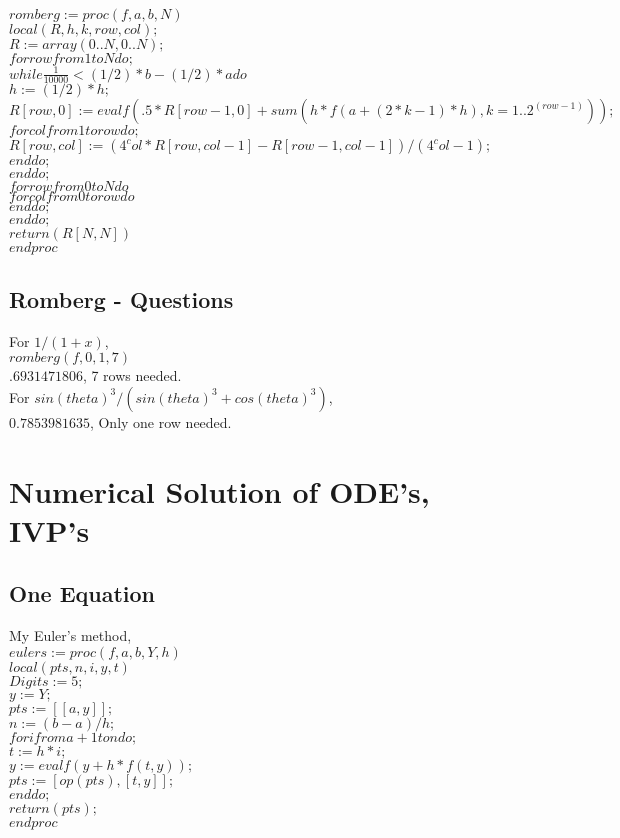 \documentclass[12pt]{article}
\begin{document}
$romberg := proc(f, a, b, N) $\\
$local(R, h, k, row, col);$\\
$R := array(0 .. N, 0 .. N);$\\
$for row from 1 to N do;$\\
$while \frac{1}{10000} < (1/2)*b-(1/2)*a do$\\
$h := (1/2)*h;$\\
$R[row, 0] := evalf(.5*R[row-1, 0]+sum(h*f(a+(2*k-1)*h), k = 1 .. 2^(row-1)));$\\
$for col from 1 to row do;$\\
$R[row, col] := (4^col*R[row, col-1]-R[row-1, col-1])/(4^col-1);$\\
$end do;$\\
$end do;$\\
$for row from 0 to N do$\\
$ for col from 0 to row do$\\

$end do;$\\

$end do;$\\
$return(R[N, N])$\\
$end proc$\\
\subsection{Romberg - Questions}
For $1/(1+x)$,\\
$romberg(f, 0, 1, 7)$\\
$.6931471806$, 7 rows needed.\\


For $sin(theta)^3/(sin(theta)^3+cos(theta)^3)$,\\
$0.7853981635$, Only one row needed.\\

\clearpage
\section{Numerical Solution of ODE's, IVP's}
\subsection{One Equation}
My Euler's method,\\

$eulers:=proc(f,a,b,Y,h)$\\
$local(pts, n, i, y, t)$\\
$Digits := 5;$\\
$y := Y;$\\
$pts := [[a, y]];$\\
$n := (b-a)/h;$\\
$for i from a+1 to n do;$\\
$t := h*i;$\\
$y := evalf(y+h*f(t, y));$\\
$pts := [op(pts), [t, y]];$\\
$end do;$\\
$return(pts);$\\
$end proc$\\
\end{document}
